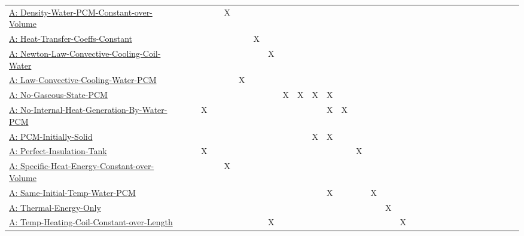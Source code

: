 \documentclass[12pt]{article}
\begin{document}
\begin{longtable}{l l l l l l l l l l l l l l l l l l l l l l l l l l l l l l l}
\\
\hyperref[A:Density-Water-PCM-Constant-over-Volume]{A: Density-Water-PCM-Constant-over-Volume} &  &  &  &  & X &  &  &  &  &  &  &  &  &  &  &  &  &  &  &  &  &  &  &  &  &  &  &  &  & 
\\
\hyperref[A:Heat-Transfer-Coeffs-Constant]{A: Heat-Transfer-Coeffs-Constant} &  &  &  &  &  &  & X &  &  &  &  &  &  &  &  &  &  &  &  &  &  &  &  &  &  &  &  &  &  & 
\\
\hyperref[A:Newton-Law-Convective-Cooling-Coil-Water]{A: Newton-Law-Convective-Cooling-Coil-Water} &  &  &  &  &  &  &  & X &  &  &  &  &  &  &  &  &  &  &  &  &  &  &  &  &  &  &  &  &  & 
\\
\hyperref[A:Law-Convective-Cooling-Water-PCM]{A: Law-Convective-Cooling-Water-PCM} &  &  &  &  &  & X &  &  &  &  &  &  &  &  &  &  &  &  &  &  &  &  &  &  &  &  &  &  &  & 
\\
\hyperref[A:No-Gaseous-State-PCM]{A: No-Gaseous-State-PCM} &  &  &  &  &  &  &  &  & X & X & X & X &  &  &  &  &  &  &  &  &  &  &  &  &  &  &  &  &  & 
\\
\hyperref[A:No-Internal-Heat-Generation-By-Water-PCM]{A: No-Internal-Heat-Generation-By-Water-PCM} &  &  & X &  &  &  &  &  &  &  &  & X & X &  &  &  &  &  &  &  &  &  &  &  &  &  &  &  &  & 
\\
\hyperref[A:PCM-Initially-Solid]{A: PCM-Initially-Solid} &  &  &  &  &  &  &  &  &  &  & X & X &  &  &  &  &  &  &  &  &  &  &  &  &  &  &  &  &  & 
\\
\hyperref[A:Perfect-Insulation-Tank]{A: Perfect-Insulation-Tank} &  &  & X &  &  &  &  &  &  &  &  &  &  & X &  &  &  &  &  &  &  &  &  &  &  &  &  &  &  & 
\\
\hyperref[A:Specific-Heat-Energy-Constant-over-Volume]{A: Specific-Heat-Energy-Constant-over-Volume} &  &  &  &  & X &  &  &  &  &  &  &  &  &  &  &  &  &  &  &  &  &  &  &  &  &  &  &  &  & 
\\
\hyperref[A:Same-Initial-Temp-Water-PCM]{A: Same-Initial-Temp-Water-PCM} &  &  &  &  &  &  &  &  &  &  &  & X &  &  & X &  &  &  &  &  &  &  &  &  &  &  &  &  &  & 
\\
\hyperref[A:Thermal-Energy-Only]{A: Thermal-Energy-Only} &  &  &  &  &  &  &  &  &  &  &  &  &  &  &  & X &  &  &  &  &  &  &  &  &  &  &  &  &  & 
\\
\hyperref[A:Temp-Heating-Coil-Constant-over-Length]{A: Temp-Heating-Coil-Constant-over-Length} &  &  &  &  &  &  &  & X &  &  &  &  &  &  &  &  & X &  &  &  &  &  &  &  &  &  &  &  &  & 
\\

\end{longtable}
\end{document}
